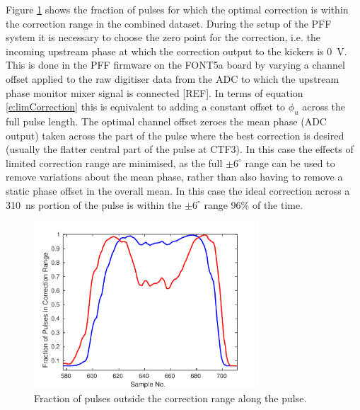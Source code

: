 Figure \ref{f:longFF_fractInRange} shows the fraction of pulses for which the optimal 
correction is within the correction range in the combined dataset. During the setup of 
the PFF system it is necessary to choose the zero point for the correction, i.e. the 
incoming upstream phase at which the correction output to the kickers is 0~V. This is 
done in the PFF firmware on the FONT5a board by varying a channel offset applied to the 
raw digitiser data from the ADC to which the upstream phase monitor mixer signal is 
connected [REF]. In terms of equation \ref{e:limCorrection} this is equivalent to adding a constant offset to \(\phi_u\) across the full pulse length. The optimal channel offset zeroes the mean phase (ADC output) taken across the part of the pulse where the best 
correction is desired (usually the flatter central part of the pulse at CTF3). In this 
case the effects of limited correction range are minimised, as the full \(\pm6^\circ\) 
range can be used to remove variations about the mean phase, rather than also having to 
remove a static phase offset in the overall mean. In this case the ideal correction 
across a 310~ns portion of the pulse is within the \(\pm6^\circ\) range 96\% of the 
time. 


\begin{figure}
  \centering
  \includegraphics[width=0.75\textwidth]{Figures/feedforward/longFF_fractInRange}
  \caption{Fraction of pulses outside the correction range along the pulse.}
  \label{f:longFF_fractInRange}
\end{figure}

